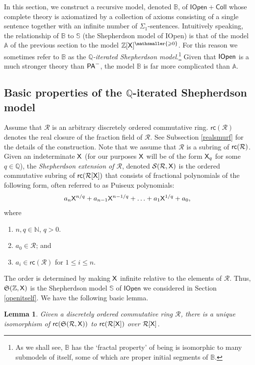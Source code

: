 \documentclass{amsart}
\renewcommand{\leq}{\leqslant}
\renewcommand{\geq}{\geqslant}
\newtheorem{lem}[theorem]{Lemma}
\newcommand{\mc}[1]{\mathcal #1}
\newcommand{\X}{{\sf X}}
\newcommand{\QS}{\mathbb{B}}
\newcommand{\shef}{\mathfrak{S}}
\begin{document}
In this section, we construct a recursive model, denoted $\QS$, of $\mathsf{IOpen + Coll}$ whose 
complete theory is axiomatized by a collection of axioms consisting of a single 
sentence together with an infinite number of $\Sigma_1$-sentences. 
Intuitively speaking, the relationship of $\QS$ to $\mathbb{S}$
(the Shepherdson model of {\sf IOpen}) is that of 
 the model $\mathbb{A}$ of the previous section to the model $\mathbb Z[\X]^{\mathsmaller{\geq 0}}$. For this reason we sometimes refer to $\mathbb{B}$ as the $\mathbb{Q}$\emph{-iterated Shepherdson model}.\footnote{As we shall see, $\mathbb{B}$ has the `fractal property' of being is isomorphic to many submodels of itself, some of which are proper initial segments of $\mathbb{B}.$} Given that ${\sf IOpen}$ is a much stronger theory than ${\sf PA}^-$, the model $\QS$ is far more complicated than $\mathbb{A}$.

\subsection{Basic properties of the $\mathbb{Q}$-iterated Shepherdson model}  
Assume that $\mc R$ is an arbitrary discretely ordered commutative ring. $\mathsf{rc}(\mc R)$ denotes the real closure of the fraction field of $\mc R$. See Subsection \ref{realsmurf} for the details of the construction. Note that we assume that $\mc R$ is a subring of ${\sf rc}(\mc R)$. Given an indeterminate $\X$ (for our purposes $\X$ will be of the form $\X_q$ for some $q \in \mathbb{Q}$), the \emph{Shepherdson extension of $\mc R$}, denoted $\mathcal{S}(\mc R,\X)$ is the ordered commutative subring of $\mathsf{rc}(\mc R[\X])$ that consists of fractional polynomials of the following form, often referred to as Puiseux polynomials:
    \[a_n\X^{n/q}+a_{n-1}\X^{n-1/q} + \ldots + a_1 \X^{1/q} + a_0,\]
    where 
    \begin{enumerate}[$1$.]
        \item    $n,q\in \mathbb{N}$, $q>0$.
        \item $a_0\in \mc R$; and
        \item $a_i\in \mathsf{rc}(\mc R)$ for $1\leq i\leq n.$
       
    \end{enumerate} 
    The order is determined by making $\X$ infinite relative to the elements of $\mc R$. 
Thus, $\shef(\mathbb{Z},\X)$ is the Shepherdson model $\mathbb{S}$ of $\mathsf{IOpen}$ we considered in Section \ref{openitself}.
We have the following basic lemma.
\begin{lem}\label{kleinesmurf}
Given a discretely ordered commutative ring $\mc R$, there is a unique isomorphism of ${\sf rc}(\shef(\mc R,\X))$ to ${\sf rc}(\mc R[\X])$ over
$\mc R[\X]$.
\end{lem}
\end{document}
